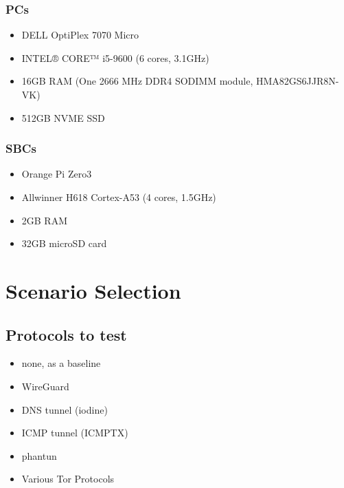 \subsubsection{PCs}
\begin{itemize}
  \item DELL OptiPlex 7070 Micro
  \item INTEL® CORE™ i5-9600 (6 cores, 3.1GHz)
  \item 16GB RAM (One 2666 MHz DDR4 SODIMM module, HMA82GS6JJR8N-VK)
  \item 512GB NVME SSD
\end{itemize}

\subsubsection{SBCs}
\begin{itemize}
  \item Orange Pi Zero3
  \item Allwinner H618 Cortex-A53 (4 cores, 1.5GHz)
  \item 2GB RAM
  \item 32GB microSD card
\end{itemize}

\section{Scenario Selection}
\subsection{Protocols to test}
\begin{itemize}
  \item none, as a baseline
  \item WireGuard
  \item DNS tunnel (iodine)
  \item ICMP tunnel (ICMPTX)
  \item phantun
  \item Various Tor Protocols
\end{itemize}


